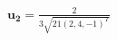 \documentclass[preview]{standalone}
\begin{document}
\begin{align*}
\mathbf{u_2}    =   \frac{2}{3 \sqrt{21  (2, 4, -1)^T }}
\end{align*}
\end{document}
